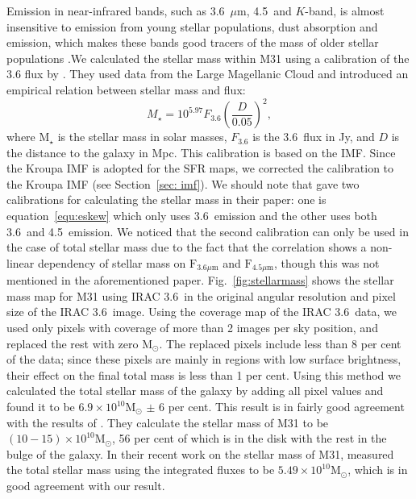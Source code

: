 Emission in near-infrared bands, such as 3.6~$\mu$m, 4.5~\um and $K$-band, is almost insensitive to emission from young stellar populations, dust absorption and emission, which makes these bands good tracers of the mass of older stellar populations \citep[e.g.][]{Elmgreen84, Eskew12, Zhu10}.We calculated the stellar mass within M31 using a calibration of the 3.6 \um flux by \citet{Eskew12}. They used data from the Large Magellanic Cloud and introduced an empirical relation between stellar mass and flux:
\begin{equation}
\label{equ:eskew}
M _{\star}= 10^{5.97} F_{3.6}\left(\frac{D}{0.05}\right)^2,
\end{equation}
\noindent where M$_{\star}$ is the stellar mass in solar masses, $F_{3.6}$ is the 3.6~\um flux in Jy, and $D$ is the distance to the galaxy in Mpc. This calibration is based on the \citet{Salpeter55} IMF. Since the Kroupa IMF is adopted for the SFR maps, we corrected the calibration to the Kroupa IMF (see Section~\ref{sec: imf}). We should note that \citet{Eskew12} gave two calibrations for calculating the stellar mass in their paper: one is equation~\ref{equ:eskew} which only uses 3.6~\um emission and the other uses both 3.6~\um and 4.5~\um emission. We noticed that the second calibration can only be used in the case of total stellar mass due to the fact that the correlation shows a non-linear dependency of stellar mass on $\mathrm{F}_{3.6 \mu \mathrm{m}}$ and $\mathrm{F}_{4.5 \mu \mathrm{m}}$, though this was not mentioned in the aforementioned paper. 
Fig.~\ref{fig:stellarmass} shows the stellar mass map for M31 using IRAC 3.6~\um in the original angular resolution and pixel size of the IRAC 3.6~\um image. Using the coverage map of the IRAC 3.6~\um data, we used only pixels with coverage of more than 2 images per sky position, and replaced the rest with zero M$_{\odot}$. The replaced pixels include less than 8 per cent of the data;  since these pixels are mainly  in regions with low surface brightness, their effect on the final total mass is less than 1 per cent.
Using this method we calculated the total stellar mass of the galaxy by adding all pixel values and found it to be $6.9 \times 10^{10}$M$_{\odot}$ $\pm$ 6 per cent. This result is in fairly good agreement with the results of \citet{Tamm12}. They calculate the stellar mass of M31 to be $(10-15) \times 10^{10}$M$_{\odot}$, 56 per cent of which is in the disk with the rest in the bulge of the galaxy. In their recent work on the stellar mass of M31, \cite{Viaene14} measured the total stellar mass using the integrated fluxes to be $5.49 \times 10^{10}$M$_{\odot}$, which is in good agreement with our result.

